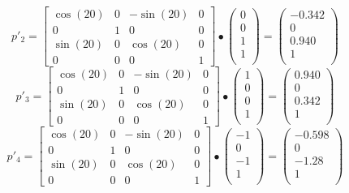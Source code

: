 \documentclass{article}
\begin{document}
	\[
		p'_{2} =
		\begin{bmatrix}
			\cos(20) & 0 & -\sin(20) & 0 \\
			0 & 1 & 0 & 0 \\
			\sin(20) & 0 &  \cos(20) & 0 \\
			0 & 0 & 0 & 1
		\end{bmatrix}
		\bullet
		\begin{pmatrix}
			0 \\ 0 \\ 1 \\ 1 \\
		\end{pmatrix}
		=
		\begin{pmatrix}
			-0.342 \\ 0 \\ 0.940 \\ 1 \\
		\end{pmatrix}
	\]
	\[
		p'_{3} =
		\begin{bmatrix}
			\cos(20) & 0 & -\sin(20) & 0 \\
			0 & 1 & 0 & 0 \\
			\sin(20) & 0 &  \cos(20) & 0 \\
			0 & 0 & 0 & 1
		\end{bmatrix}
		\bullet
		\begin{pmatrix}
			1 \\ 0 \\ 0 \\ 1 \\
		\end{pmatrix}
		=
		\begin{pmatrix}
			0.940 \\ 0 \\ 0.342 \\ 1 \\
		\end{pmatrix}
	\]
	\[
		p'_{4} =
		\begin{bmatrix}
			\cos(20) & 0 & -\sin(20) & 0 \\
			0 & 1 & 0 & 0 \\
			\sin(20) & 0 &  \cos(20) & 0 \\
			0 & 0 & 0 & 1
		\end{bmatrix}
		\bullet
		\begin{pmatrix}
			-1 \\ 0 \\ -1 \\ 1 \\
		\end{pmatrix}
		=
		\begin{pmatrix}
			-0.598 \\ 0 \\ -1.28 \\ 1 \\
		\end{pmatrix}
	\]
\end{document}
